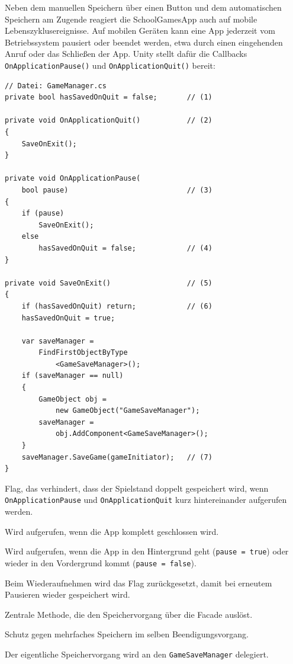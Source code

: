 \documentclass[12pt,a4paper]{article}
\begin{document}
Neben dem manuellen Speichern über einen Button und dem automatischen Speichern am Zugende reagiert die SchoolGamesApp auch auf mobile Lebenszyklusereignisse. Auf mobilen Geräten kann eine App jederzeit vom Betriebssystem pausiert oder beendet werden, etwa durch einen eingehenden Anruf oder das Schließen der App. Unity stellt dafür die Callbacks \texttt{OnApplicationPause()} und \texttt{OnApplicationQuit()} bereit:

\begin{lstlisting}
// Datei: GameManager.cs
private bool hasSavedOnQuit = false;       // (1)

private void OnApplicationQuit()           // (2)
{
    SaveOnExit();
}

private void OnApplicationPause(
    bool pause)                            // (3)
{
    if (pause)
        SaveOnExit();
    else
        hasSavedOnQuit = false;            // (4)
}

private void SaveOnExit()                  // (5)
{
    if (hasSavedOnQuit) return;            // (6)
    hasSavedOnQuit = true;

    var saveManager =
        FindFirstObjectByType
            <GameSaveManager>();
    if (saveManager == null)
    {
        GameObject obj =
            new GameObject("GameSaveManager");
        saveManager =
            obj.AddComponent<GameSaveManager>();
    }
    saveManager.SaveGame(gameInitiator);   // (7)
}
\end{lstlisting}

\begin{description}[leftmargin=2em, labelwidth=1.5em]
    \item[(1)] Flag, das verhindert, dass der Spielstand doppelt gespeichert wird, wenn \texttt{OnApplicationPause} und \texttt{OnApplicationQuit} kurz hintereinander aufgerufen werden.
    \item[(2)] Wird aufgerufen, wenn die App komplett geschlossen wird.
    \item[(3)] Wird aufgerufen, wenn die App in den Hintergrund geht (\texttt{pause = true}) oder wieder in den Vordergrund kommt (\texttt{pause = false}).
    \item[(4)] Beim Wiederaufnehmen wird das Flag zurückgesetzt, damit bei erneutem Pausieren wieder gespeichert wird.
    \item[(5)] Zentrale Methode, die den Speichervorgang über die Facade auslöst.
    \item[(6)] Schutz gegen mehrfaches Speichern im selben Beendigungsvorgang.
    \item[(7)] Der eigentliche Speichervorgang wird an den \texttt{GameSaveManager} delegiert.
\end{description}
\end{document}
